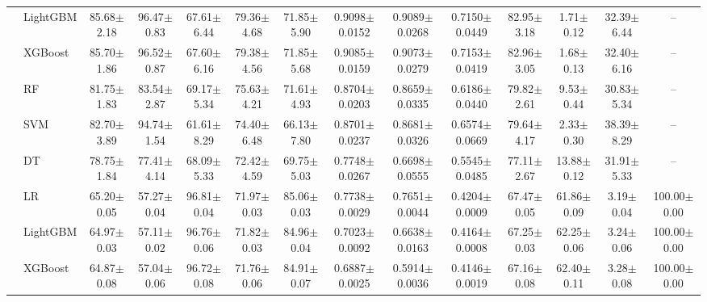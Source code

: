 \begin{tabular}{@{}llcccccccccccc@{}}
 & LightGBM & 85.68{\tiny$\pm$2.18} & 96.47{\tiny$\pm$0.83} & 67.61{\tiny$\pm$6.44} & 79.36{\tiny$\pm$4.68} & 71.85{\tiny$\pm$5.90} & 0.9098{\tiny$\pm$0.0152} & 0.9089{\tiny$\pm$0.0268} & 0.7150{\tiny$\pm$0.0449} & 82.95{\tiny$\pm$3.18} & 1.71{\tiny$\pm$0.12} & 32.39{\tiny$\pm$6.44} & --\\
 & XGBoost & 85.70{\tiny$\pm$1.86} & 96.52{\tiny$\pm$0.87} & 67.60{\tiny$\pm$6.16} & 79.38{\tiny$\pm$4.56} & 71.85{\tiny$\pm$5.68} & 0.9085{\tiny$\pm$0.0159} & 0.9073{\tiny$\pm$0.0279} & 0.7153{\tiny$\pm$0.0419} & 82.96{\tiny$\pm$3.05} & 1.68{\tiny$\pm$0.13} & 32.40{\tiny$\pm$6.16} & --\\
 & RF & 81.75{\tiny$\pm$1.83} & 83.54{\tiny$\pm$2.87} & 69.17{\tiny$\pm$5.34} & 75.63{\tiny$\pm$4.21} & 71.61{\tiny$\pm$4.93} & 0.8704{\tiny$\pm$0.0203} & 0.8659{\tiny$\pm$0.0335} & 0.6186{\tiny$\pm$0.0440} & 79.82{\tiny$\pm$2.61} & 9.53{\tiny$\pm$0.44} & 30.83{\tiny$\pm$5.34} & --\\
 & SVM & 82.70{\tiny$\pm$3.89} & 94.74{\tiny$\pm$1.54} & 61.61{\tiny$\pm$8.29} & 74.40{\tiny$\pm$6.48} & 66.13{\tiny$\pm$7.80} & 0.8701{\tiny$\pm$0.0237} & 0.8681{\tiny$\pm$0.0326} & 0.6574{\tiny$\pm$0.0669} & 79.64{\tiny$\pm$4.17} & 2.33{\tiny$\pm$0.30} & 38.39{\tiny$\pm$8.29} & --\\
 & DT & 78.75{\tiny$\pm$1.84} & 77.41{\tiny$\pm$4.14} & 68.09{\tiny$\pm$5.33} & 72.42{\tiny$\pm$4.59} & 69.75{\tiny$\pm$5.03} & 0.7748{\tiny$\pm$0.0267} & 0.6698{\tiny$\pm$0.0555} & 0.5545{\tiny$\pm$0.0485} & 77.11{\tiny$\pm$2.67} & 13.88{\tiny$\pm$0.12} & 31.91{\tiny$\pm$5.33} & --\\
\midrule
{} & LR & 65.20{\tiny$\pm$0.05} & 57.27{\tiny$\pm$0.04} & 96.81{\tiny$\pm$0.04} & 71.97{\tiny$\pm$0.03} & 85.06{\tiny$\pm$0.03} & 0.7738{\tiny$\pm$0.0029} & 0.7651{\tiny$\pm$0.0044} & 0.4204{\tiny$\pm$0.0009} & 67.47{\tiny$\pm$0.05} & 61.86{\tiny$\pm$0.09} & 3.19{\tiny$\pm$0.04} & 100.00{\tiny$\pm$0.00}\\
 & LightGBM & 64.97{\tiny$\pm$0.03} & 57.11{\tiny$\pm$0.02} & 96.76{\tiny$\pm$0.06} & 71.82{\tiny$\pm$0.03} & 84.96{\tiny$\pm$0.04} & 0.7023{\tiny$\pm$0.0092} & 0.6638{\tiny$\pm$0.0163} & 0.4164{\tiny$\pm$0.0008} & 67.25{\tiny$\pm$0.03} & 62.25{\tiny$\pm$0.06} & 3.24{\tiny$\pm$0.06} & 100.00{\tiny$\pm$0.00}\\
 & XGBoost & 64.87{\tiny$\pm$0.08} & 57.04{\tiny$\pm$0.06} & 96.72{\tiny$\pm$0.08} & 71.76{\tiny$\pm$0.06} & 84.91{\tiny$\pm$0.07} & 0.6887{\tiny$\pm$0.0025} & 0.5914{\tiny$\pm$0.0036} & 0.4146{\tiny$\pm$0.0019} & 67.16{\tiny$\pm$0.08} & 62.40{\tiny$\pm$0.11} & 3.28{\tiny$\pm$0.08} & 100.00{\tiny$\pm$0.00}\\

\end{tabular}
